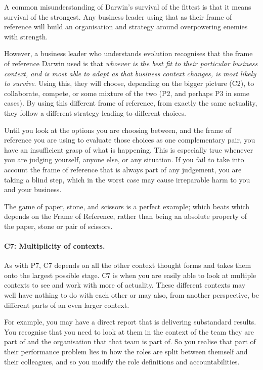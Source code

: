 A common misunderstanding of Darwin's survival of the fittest is that it means survival of the strongest. Any business leader using that as their frame of reference will build an organisation and strategy around overpowering enemies with strength.


However, a business leader who understands evolution recognises that the frame of reference Darwin  used is that \emph{whoever is the best fit to their particular business context, and is most able to adapt as that business context changes, is most likely to survive}. Using this,  they will choose, depending on the bigger picture (C2), to collaborate, compete, or some mixture of the two (P2, and perhaps P3 in some cases). By using this different frame of reference, from exactly the same actuality, they follow a different strategy leading to different choices.


Until you look at the options you are choosing between, and the frame of reference you are using to evaluate those choices as one complementary pair, you have an insufficient grasp of what is happening. This is especially true whenever you are judging yourself, anyone else, or any situation. If you fail to take into account the frame of reference that is always part of any judgement, you are taking a blind step, which in the worst case may cause irreparable harm to you and your business.


The game of paper, stone, and scissors is a perfect example; which beats which depends on the Frame of Reference, rather than being an absolute property of the paper, stone or pair of scissors.
\paragraph{\textbf{C7: Multiplicity of contexts.}}
As with P7, C7 depends on all the other context thought forms and takes them onto the largest possible stage. C7 is when you are easily able to look at multiple contexts to see and work with more of actuality. These different contexts may well have nothing to do with each other or may also, from another perspective, be different parts of an even larger context.


For example, you may have a direct report that is delivering substandard results. You recognise that you need to look at them in the context of the team they are part of and the organisation that that team is part of. So you realise that part of their performance problem lies in how the roles are split between themself and their colleagues, and so you modify the role definitions and accountabilities.



